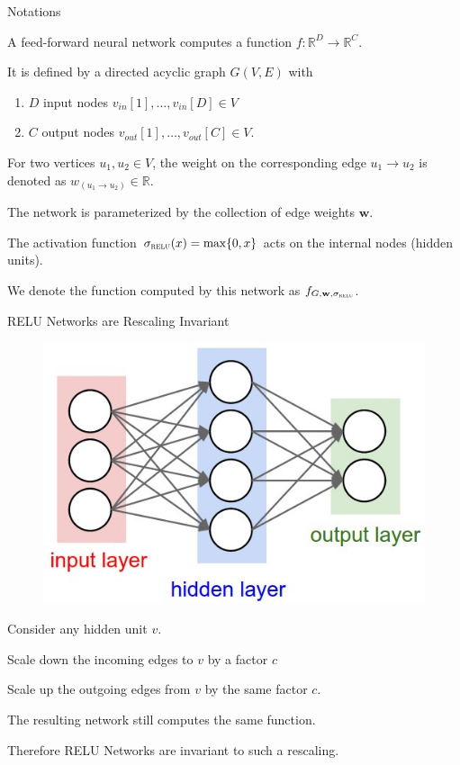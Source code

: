 \documentclass[presentation,xcolor={usenames,dvipsnames},10pt]{beamer}
\newcommand{\vin}{v_{in}}
\newcommand{\vout}{v_{out}}
\newcommand{\relu}{\sigma_{\textsc{relu}}}
\begin{document}
\begin{frame}{Notations}

\begin{definition}
A feed-forward neural network computes a function $f:\mathbb{R}^D \rightarrow \mathbb{R}^C$.

It is defined by a directed acyclic graph $G(V,E)$ with 
\begin{enumerate} 
	\item $D$ input nodes
	$\vin[1],\dots,\vin[D]\in V$
	\item $C$ output nodes $\vout[1],\dots,
	\vout[C]\in V$.
\end{enumerate}

For two vertices $u_1,u_2 \in V$, the weight on the corresponding edge $u_1\rightarrow u_2$ is denoted as $w_{(u_1\rightarrow u_2)} \in \mathbb{R}$. 

The network is parameterized by the collection of edge weights $\mathbf{w}$.

The activation function
$\relu(x) = \max\{0,x\}$ acts on the internal nodes (hidden
units).

We denote the function computed by this network as
$f_{G,\mathbf{w},\relu}$. 
\end{definition}

\end{frame}


\begin{frame}{RELU Networks are Rescaling Invariant}

\begin{figure}
	\includegraphics[scale=0.2]{neural_net.jpeg}
\end{figure}


\bit 
\item Consider any hidden unit $v$.

\item Scale down the incoming edges to $v$ by a factor $c$

\item Scale up the outgoing edges from $v$ by the same factor $c$.

\item The resulting network still computes the same function. 

\item Therefore RELU Networks are invariant to such a rescaling. 
\eit 
\end{frame} 
\end{document}
